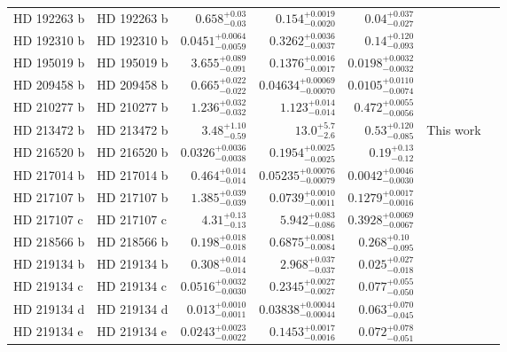 \begin{longtable*}{llrrrrr}
HD 192263 b & HD 192263 b & $0.658^{+0.03}_{-0.03}$ & $0.154^{+0.0019}_{-0.0020}$ & $0.04^{+0.037}_{-0.027}$ & \cite{Santos00} & \\ 
HD 192310 b & HD 192310 b & $0.0451^{+0.0064}_{-0.0059}$ & $0.3262^{+0.0036}_{-0.0037}$ & $0.14^{+0.120}_{-0.093}$ & \cite{Howard11} & \\ 
HD 195019 b & HD 195019 b & $3.655^{+0.089}_{-0.091}$ & $0.1376^{+0.0016}_{-0.0017}$ & $0.0198^{+0.0032}_{-0.0032}$ & \cite{Fischer99} & \\ 
HD 209458 b & HD 209458 b & $0.665^{+0.022}_{-0.022}$ & $0.04634^{+0.00069}_{-0.00070}$ & $0.0105^{+0.0110}_{-0.0074}$ & \cite{Henry00} & \\ 
HD 210277 b & HD 210277 b & $1.236^{+0.032}_{-0.032}$ & $1.123^{+0.014}_{-0.014}$ & $0.472^{+0.0055}_{-0.0056}$ & \cite{Marcy99} & \\ 
HD 213472 b & HD 213472 b & $3.48^{+1.10}_{-0.59}$ & $13.0^{+5.7}_{-2.6}$ & $0.53^{+0.120}_{-0.085}$ & This work & \\ 
HD 216520 b & HD 216520 b & $0.0326^{+0.0036}_{-0.0038}$ & $0.1954^{+0.0025}_{-0.0025}$ & $0.19^{+0.13}_{-0.12}$ & \cite{Burt et al. in prep} & \\ 
HD 217014 b & HD 217014 b & $0.464^{+0.014}_{-0.014}$ & $0.05235^{+0.00076}_{-0.00079}$ & $0.0042^{+0.0046}_{-0.0030}$ & \cite{Mayor95} & \\ 
HD 217107 b & HD 217107 b & $1.385^{+0.039}_{-0.039}$ & $0.0739^{+0.0010}_{-0.0011}$ & $0.1279^{+0.0017}_{-0.0016}$ & \cite{Vogt05} & \\ 
HD 217107 c & HD 217107 c & $4.31^{+0.13}_{-0.13}$ & $5.942^{+0.083}_{-0.086}$ & $0.3928^{+0.0069}_{-0.0067}$ & \cite{Vogt05} & \\ 
HD 218566 b & HD 218566 b & $0.198^{+0.018}_{-0.018}$ & $0.6875^{+0.0081}_{-0.0084}$ & $0.268^{+0.10}_{-0.095}$ & \cite{Meschiari11} & \\ 
HD 219134 b & HD 219134 b & $0.308^{+0.014}_{-0.014}$ & $2.968^{+0.037}_{-0.037}$ & $0.025^{+0.027}_{-0.018}$ & \cite{Vogt15} & \\ 
HD 219134 c & HD 219134 c & $0.0516^{+0.0032}_{-0.0030}$ & $0.2345^{+0.0027}_{-0.0027}$ & $0.077^{+0.055}_{-0.050}$ & \cite{Vogt15} & \\ 
HD 219134 d & HD 219134 d & $0.013^{+0.0010}_{-0.0011}$ & $0.03838^{+0.00044}_{-0.00044}$ & $0.063^{+0.070}_{-0.045}$ & \cite{Vogt15} & \\ 
HD 219134 e & HD 219134 e & $0.0243^{+0.0023}_{-0.0022}$ & $0.1453^{+0.0017}_{-0.0016}$ & $0.072^{+0.078}_{-0.051}$ & \cite{Vogt15} & \\ 

\end{longtable*}
